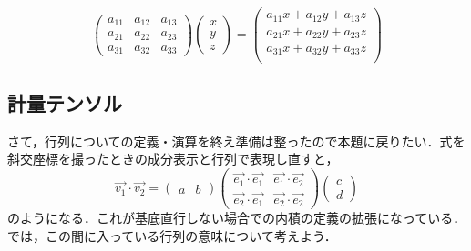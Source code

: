 \documentclass[dvipdfmx,a4]{jsarticle}
\begin{document}
\begin{equation*}
  \begin{pmatrix}
    a_{11} & a_{12} & a_{13} \\
    a_{21} & a_{22} & a_{23} \\
    a_{31} & a_{32} & a_{33}
  \end{pmatrix}
  \begin{pmatrix}
    x \\
    y \\
    z
  \end{pmatrix}
  =
  \begin{pmatrix}
    a_{11}x + a_{12} y +a_{13}z \\
    a_{21}x + a_{22} y +a_{23}z \\
    a_{31}x + a_{32} y +a_{33}z \\
  \end{pmatrix}
\end{equation*}

\subsection{計量テンソル}
さて，行列についての定義・演算を終え準備は整ったので本題に戻りたい．式を斜交座標を撮ったときの成分表示と行列で表現し直すと，
\begin{equation*}
  \vec{v_1}\cdot \vec{v_2}=
  \begin{pmatrix}
    a & b
  \end{pmatrix}
  \begin{pmatrix}
    \vec{e_1} \cdot \vec{e_1} & \vec{e_1} \cdot \vec{e_2} \\
    \vec{e_2} \cdot \vec{e_1} & \vec{e_2} \cdot \vec{e_2}
  \end{pmatrix}
  \begin{pmatrix}
    c \\
    d
  \end{pmatrix}
\end{equation*}
のようになる．これが基底直行しない場合での内積の定義の拡張になっている．では，この間に入っている行列の意味について考えよう．
\end{document}
